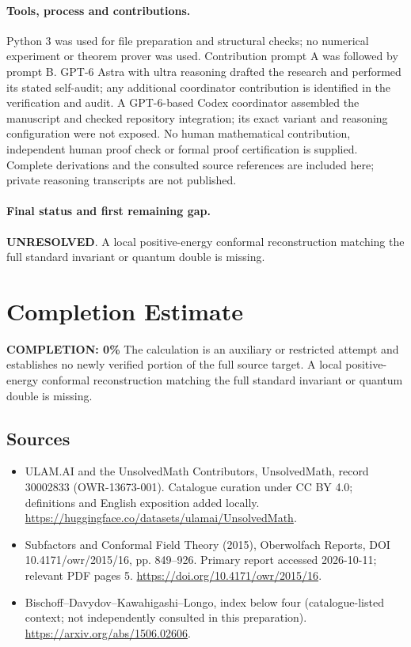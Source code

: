 \documentclass[11pt]{article}
\begin{document}
\paragraph{Tools, process and contributions.}
Python 3 was used for file preparation and structural checks; no numerical experiment or theorem prover was used. Contribution prompt A was followed by prompt B. GPT-6 Astra with ultra reasoning drafted the research and performed its stated self-audit; any additional coordinator contribution is identified in the verification and audit. A GPT-6-based Codex coordinator assembled the manuscript and checked repository integration; its exact variant and reasoning configuration were not exposed. No human mathematical contribution, independent human proof check or formal proof certification is supplied. Complete derivations and the consulted source references are included here; private reasoning transcripts are not published.

\paragraph{Final status and first remaining gap.}
\textbf{UNRESOLVED}. A local positive-energy conformal reconstruction matching the full standard invariant or quantum double is missing.

\section{Completion Estimate}
\noindent\textbf{COMPLETION: 0\%}
The calculation is an auxiliary or restricted attempt and establishes no newly verified portion of the full source target. A local positive-energy conformal reconstruction matching the full standard invariant or quantum double is missing.

\subsection{Sources}
\begin{itemize}
\item[\hypertarget{source:30002833:1}{S1}] ULAM.AI and the UnsolvedMath Contributors, UnsolvedMath, record 30002833 (OWR-13673-001). Catalogue curation under CC BY 4.0; definitions and English exposition added locally.
\url{https://huggingface.co/datasets/ulamai/UnsolvedMath}.
\item[\hypertarget{source:30002833:2}{S2}] Subfactors and Conformal Field Theory (2015), Oberwolfach Reports, DOI 10.4171/owr/2015/16, pp. 849--926. Primary report accessed 2026-10-11; relevant PDF pages 5.
\url{https://doi.org/10.4171/owr/2015/16}.
\item[\hypertarget{source:30002833:3}{S3}] Bischoff--Davydov--Kawahigashi--Longo, index below four (catalogue-listed context; not independently consulted in this preparation).
\url{https://arxiv.org/abs/1506.02606}.
\end{itemize}
\label{end:30002833}
\end{document}
